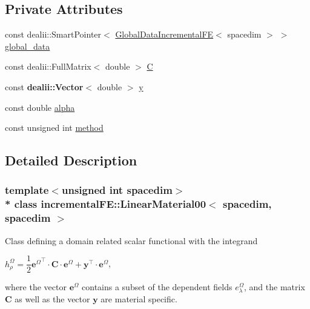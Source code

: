 \subsection*{Private Attributes}
\begin{DoxyCompactItemize}
\item 
const dealii\+::\+Smart\+Pointer$<$ \hyperlink{classincremental_f_e_1_1_global_data_incremental_f_e}{Global\+Data\+Incremental\+FE}$<$ spacedim $>$ $>$ \hyperlink{classincremental_f_e_1_1_linear_material00_3_01spacedim_00_01spacedim_01_4_a4dd0b5104cb011bc4c2757c82aad7b24}{global\+\_\+data}
\item 
const dealii\+::\+Full\+Matrix$<$ double $>$ \hyperlink{classincremental_f_e_1_1_linear_material00_3_01spacedim_00_01spacedim_01_4_a73536564b0df52fe76ec1c14b9dbe116}{C}
\item 
const {\bf dealii\+::\+Vector}$<$ double $>$ \hyperlink{classincremental_f_e_1_1_linear_material00_3_01spacedim_00_01spacedim_01_4_a98fe1a6dd427e3bf9fe416b9525d2725}{y}
\item 
const double \hyperlink{classincremental_f_e_1_1_linear_material00_3_01spacedim_00_01spacedim_01_4_a12c7da528cdd260b6a09bd9e66213781}{alpha}
\item 
const unsigned int \hyperlink{classincremental_f_e_1_1_linear_material00_3_01spacedim_00_01spacedim_01_4_aa8c59701106680d7d5e474674f1a5b00}{method}
\end{DoxyCompactItemize}


\subsection{Detailed Description}
\subsubsection*{template$<$unsigned int spacedim$>$\\*
class incremental\+F\+E\+::\+Linear\+Material00$<$ spacedim, spacedim $>$}

Class defining a domain related scalar functional with the integrand

$h^\Omega_\rho = \dfrac{1}{2} {\boldsymbol{e}^\Omega}^\top \cdot \boldsymbol{C} \cdot \boldsymbol{e}^\Omega + \boldsymbol{y}^\top \cdot \boldsymbol{e}^\Omega$,

where the vector $\boldsymbol{e}^\Omega$ contains a subset of the dependent fields $e^\Omega_\lambda$, and the matrix $\boldsymbol{C}$ as well as the vector $\boldsymbol{y}$ are material specific. 

